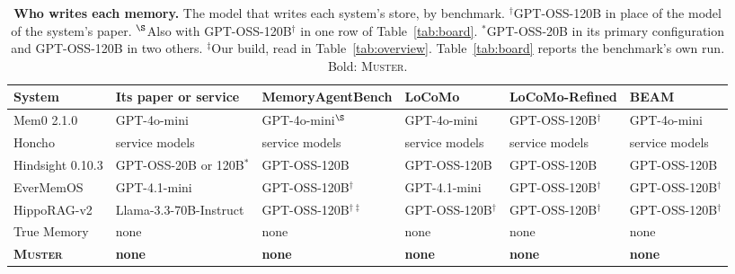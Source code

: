 \documentclass{article}
\newcommand{\ours}{\rowcolor{oursbg}}
\newcommand{\tabfont}{\fontsize{7.5}{8.5}\selectfont\renewcommand{\arraystretch}{1.0}}
\newcommand{\sys}{\textsc{Muster}}
\begin{document}
\begin{table}[H]
\centering\tabfont
\caption{\textbf{Who writes each memory.} The model that writes each system's store, by benchmark. $^\dagger$GPT-OSS-120B in place of the model of the system's paper. $^\S$Also with GPT-OSS-120B$^\dagger$ in one row of Table~\ref{tab:board}. $^\ast$GPT-OSS-20B in its primary configuration and GPT-OSS-120B in two others. $^\ddagger$Our build, read in Table~\ref{tab:overview}. Table~\ref{tab:board} reports the benchmark's own run. Bold: \sys{}.}
\label{tab:writers}
\setlength{\tabcolsep}{3pt}
\begin{tabular}{llllll}
\toprule
System & Its paper or service & MemoryAgentBench & LoCoMo & LoCoMo-Refined & BEAM \\
\midrule
Mem0 2.1.0 & GPT-4o-mini & GPT-4o-mini$^\S$ & GPT-4o-mini & GPT-OSS-120B$^\dagger$ & GPT-4o-mini \\
Honcho & service models & service models & service models & service models & service models \\
Hindsight 0.10.3 & GPT-OSS-20B or 120B$^\ast$ & GPT-OSS-120B & GPT-OSS-120B & GPT-OSS-120B & GPT-OSS-120B \\
EverMemOS & GPT-4.1-mini & GPT-OSS-120B$^\dagger$ & GPT-4.1-mini & GPT-OSS-120B$^\dagger$ & GPT-OSS-120B$^\dagger$ \\
HippoRAG-v2 & Llama-3.3-70B-Instruct & GPT-OSS-120B$^{\dagger\ddagger}$ & GPT-OSS-120B$^\dagger$ & GPT-OSS-120B$^\dagger$ & GPT-OSS-120B$^\dagger$ \\
True Memory & none & none & none & none & none \\
\ours \textbf{\sys{}} & \textbf{none} & \textbf{none} & \textbf{none} & \textbf{none} & \textbf{none} \\
\bottomrule
\end{tabular}
\end{table}
\end{document}
